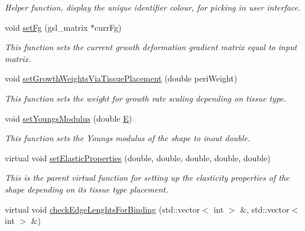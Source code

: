 \begin{DoxyCompactItemize}
\begin{DoxyCompactList}\small\item\em Helper function, display the unique identifier colour, for picking in user interface. \end{DoxyCompactList}\item 
\hypertarget{classShapeBase_ad39c3f3a555a89e106c4afaaf81c72f6}{}void \hyperlink{classShapeBase_ad39c3f3a555a89e106c4afaaf81c72f6}{set\+Fg} (gsl\+\_\+matrix $\ast$curr\+Fg)\label{classShapeBase_ad39c3f3a555a89e106c4afaaf81c72f6}

\begin{DoxyCompactList}\small\item\em This function sets the current grwoth deformation gradient matrix equal to input matrix. \end{DoxyCompactList}\item 
\hypertarget{classShapeBase_a38a100fb162232636bf666eb1603f023}{}void \hyperlink{classShapeBase_a38a100fb162232636bf666eb1603f023}{set\+Growth\+Weights\+Via\+Tissue\+Placement} (double peri\+Weight)\label{classShapeBase_a38a100fb162232636bf666eb1603f023}

\begin{DoxyCompactList}\small\item\em This function sets the weight for growth rate scaling depending on tissue type. \end{DoxyCompactList}\item 
\hypertarget{classShapeBase_a27bc09051d65ebc27e31b67462950070}{}void \hyperlink{classShapeBase_a27bc09051d65ebc27e31b67462950070}{set\+Youngs\+Modulus} (double \hyperlink{classShapeBase_a6c1a3a0173841d6072a5268978463ff2}{E})\label{classShapeBase_a27bc09051d65ebc27e31b67462950070}

\begin{DoxyCompactList}\small\item\em This function sets the Young\textquotesingle{}s modulus of the shape to inout double. \end{DoxyCompactList}\item 
\hypertarget{classShapeBase_aac3988352864bd06d7509b74977320d8}{}virtual void \hyperlink{classShapeBase_aac3988352864bd06d7509b74977320d8}{set\+Elastic\+Properties} (double, double, double, double, double)\label{classShapeBase_aac3988352864bd06d7509b74977320d8}

\begin{DoxyCompactList}\small\item\em This is the parent virtual function for setting up the elasticity properties of the shape depending on its tissue type placement. \end{DoxyCompactList}\item 
\hypertarget{classShapeBase_ab277fb6868925516b675821add019cef}{}virtual void \hyperlink{classShapeBase_ab277fb6868925516b675821add019cef}{check\+Edge\+Lenghts\+For\+Binding} (std\+::vector$<$ int $>$ \&, std\+::vector$<$ int $>$ \&)\label{classShapeBase_ab277fb6868925516b675821add019cef}


\end{DoxyCompactItemize}
